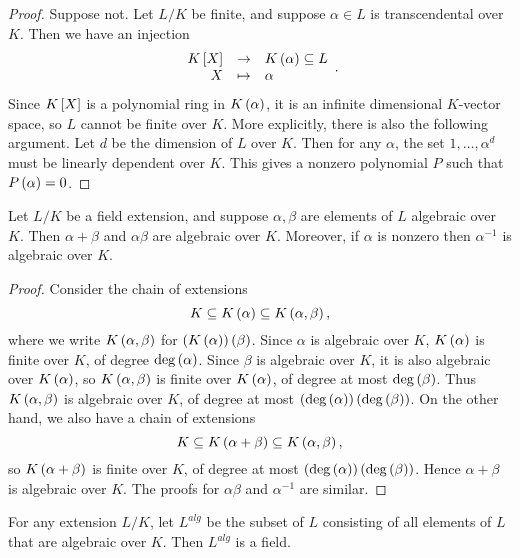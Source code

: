 \begin{proof}
Suppose not. Let $ L / K $ be finite, and suppose $ \alpha \in L $ is transcendental over $ K $. Then we have an injection
$$ \function{K\sb{X}}{K\rb{\alpha} \subseteq L}{X}{\alpha}. $$
Since $ K\sb{X} $ is a polynomial ring in $ K\rb{\alpha} $, it is an infinite dimensional $ K $-vector space, so $ L $ cannot be finite over $ K $. More explicitly, there is also the following argument. Let $ d $ be the dimension of $ L $ over $ K $. Then for any $ \alpha $, the set $ 1, \dots, \alpha^d $ must be linearly dependent over $ K $. This gives a nonzero polynomial $ P $ such that $ P\rb{\alpha} = 0 $.
\end{proof}

\pagebreak

\begin{corollary}
Let $ L / K $ be a field extension, and suppose $ \alpha, \beta $ are elements of $ L $ algebraic over $ K $. Then $ \alpha + \beta $ and $ \alpha\beta $ are algebraic over $ K $. Moreover, if $ \alpha $ is nonzero then $ \alpha^{-1} $ is algebraic over $ K $.
\end{corollary}

\begin{proof}
Consider the chain of extensions
$$ K \subseteq K\rb{\alpha} \subseteq K\rb{\alpha, \beta}, $$
where we write $ K\rb{\alpha, \beta} $ for $ \rb{K\rb{\alpha}}\rb{\beta} $. Since $ \alpha $ is algebraic over $ K $, $ K\rb{\alpha} $ is finite over $ K $, of degree $ \deg\rb{\alpha} $. Since $ \beta $ is algebraic over $ K $, it is also algebraic over $ K\rb{\alpha} $, so $ K\rb{\alpha, \beta} $ is finite over $ K\rb{\alpha} $, of degree at most $ \deg\rb{\beta} $. Thus $ K\rb{\alpha, \beta} $ is algebraic over $ K $, of degree at most $ \rb{\deg\rb{\alpha}}\rb{\deg\rb{\beta}} $. On the other hand, we also have a chain of extensions
$$ K \subseteq K\rb{\alpha + \beta} \subseteq K\rb{\alpha, \beta}, $$
so $ K\rb{\alpha + \beta} $ is finite over $ K $, of degree at most $ \rb{\deg\rb{\alpha}}\rb{\deg\rb{\beta}} $. Hence $ \alpha + \beta $ is algebraic over $ K $. The proofs for $ \alpha\beta $ and $ \alpha^{-1} $ are similar.
\end{proof}

\begin{corollary}
For any extension $ L / K $, let $ L^{alg} $ be the subset of $ L $ consisting of all elements of $ L $ that are algebraic over $ K $. Then $ L^{alg} $ is a field.
\end{corollary}

